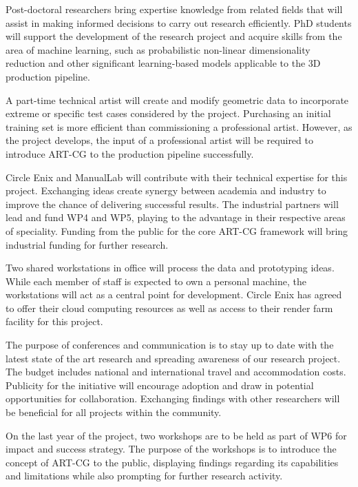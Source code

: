 \documentclass[a4paper, 11pt, onecolumn]{article} %
\numberwithin{equation}{section} %
\numberwithin{figure}{section} %
\numberwithin{table}{section} %
\begin{document}
Post-doctoral researchers bring expertise knowledge from related fields that will assist in making informed decisions to carry out research efficiently. PhD students will support the development of the research project and acquire skills from the area of machine learning, such as probabilistic non-linear dimensionality reduction and other significant learning-based models applicable to the 3D production pipeline.

A part-time technical artist will create and modify geometric data to incorporate extreme or specific test cases considered by the project. Purchasing an initial training set is more efficient than commissioning a professional artist. However, as the project develops, the input of a professional artist will be required to introduce ART-CG to the production pipeline successfully.

Circle Enix and ManualLab will contribute with their technical expertise for this project. Exchanging ideas create synergy between academia and industry to improve the chance of delivering successful results. The industrial partners will lead and fund WP4 and WP5, playing to the advantage in their respective areas of speciality. Funding from the public for the core ART-CG framework will bring industrial funding for further research.

Two shared workstations in office will process the data and prototyping ideas. While each member of staff is expected to own a personal machine, the workstations will act as a central point for development. Circle Enix has agreed to offer their cloud computing resources as well as access to their render farm facility for this project.

The purpose of conferences and communication is to stay up to date with the latest state of the art research and spreading awareness of our research project. The budget includes national and international travel and accommodation costs. Publicity for the initiative will encourage adoption and draw in potential opportunities for collaboration. Exchanging findings with other researchers will be beneficial for all projects within the community.

On the last year of the project, two workshops are to be held as part of WP6 for impact and success strategy. The purpose of the workshops is to introduce the concept of ART-CG to the public, displaying findings regarding its capabilities and limitations while also prompting for further research activity.

\newpage
\end{document}
